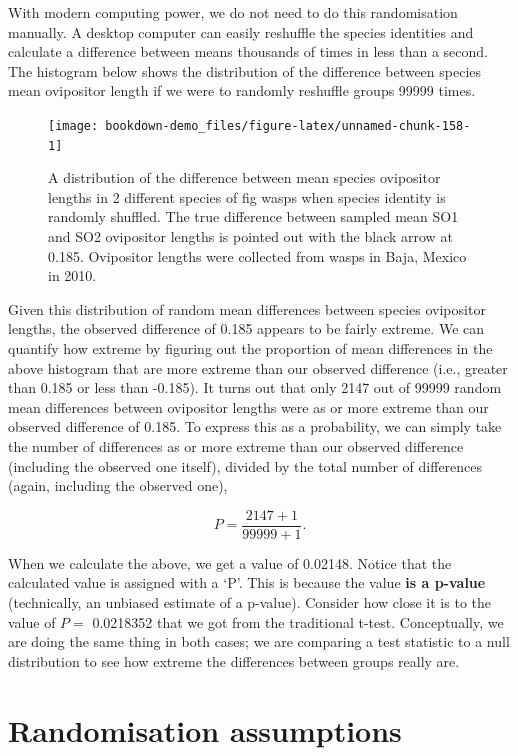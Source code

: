 \documentclass[
  openany]{scrbook}
\begin{document}
With modern computing power, we do not need to do this randomisation manually.
A desktop computer can easily reshuffle the species identities and calculate a difference between means thousands of times in less than a second.
The histogram below shows the distribution of the difference between species mean ovipositor length if we were to randomly reshuffle groups 99999 times.

\begin{figure}
\texttt{[image: bookdown-demo\_files/figure-latex/unnamed-chunk-158-1]} \caption{A distribution of the difference between mean species ovipositor lengths in 2 different species of fig wasps when species identity is randomly shuffled. The true difference between sampled mean SO1 and SO2 ovipositor lengths is pointed out with the black arrow at 0.185. Ovipositor lengths were collected from wasps in Baja, Mexico in 2010.}\label{fig:unnamed-chunk-158}
\end{figure}

Given this distribution of random mean differences between species ovipositor lengths, the observed difference of 0.185 appears to be fairly extreme.
We can quantify how extreme by figuring out the proportion of mean differences in the above histogram that are more extreme than our observed difference (i.e., greater than 0.185 or less than -0.185).
It turns out that only 2147 out of 99999 random mean differences between ovipositor lengths were as or more extreme than our observed difference of 0.185.
To express this as a probability, we can simply take the number of differences as or more extreme than our observed difference (including the observed one itself), divided by the total number of differences (again, including the observed one),

\[P = \frac{2147 + 1}{99999 + 1}.\]

When we calculate the above, we get a value of 0.02148.
Notice that the calculated value is assigned with a `P'.
This is because the value \textbf{is a p-value} (technically, an unbiased estimate of a p-value). Consider how close it is to the value of \(P =\) 0.0218352 that we got from the traditional t-test.
Conceptually, we are doing the same thing in both cases; we are comparing a test statistic to a null distribution to see how extreme the differences between groups really are.

\hypertarget{randomisation-assumptions}{%
\section{Randomisation assumptions}\label{randomisation-assumptions}}
\end{document}
